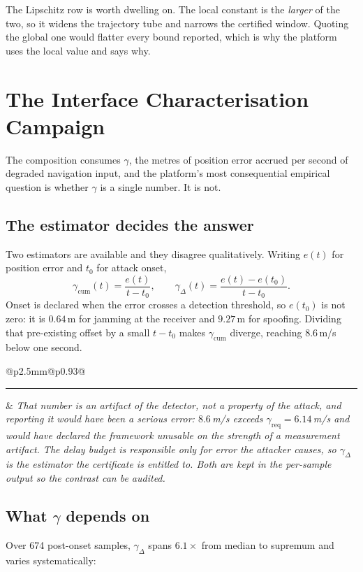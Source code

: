 \documentclass[11pt,a4paper]{article}
\makeatletter
\newcommand{\provbox}[1]{%
  \par\medskip\noindent
  \begin{tabular}{@{}p{2.5mm}@{\hspace{3mm}}p{0.93\linewidth}@{}}
  \textcolor{bridgecol}{\rule{2.5mm}{\baselineskip}} & \small\itshape #1
  \end{tabular}\par\medskip}
\makeatother
\begin{document}
The Lipschitz row is worth dwelling on. The local constant is the \emph{larger}
of the two, so it widens the trajectory tube and narrows the certified window.
Quoting the global one would flatter every bound reported, which is why the
platform uses the local value and says why.

\section{The Interface Characterisation Campaign}

The composition consumes $\gamma$, the metres of position error accrued per
second of degraded navigation input, and the platform's most consequential
empirical question is whether $\gamma$ is a single number. It is not.

\subsection{The estimator decides the answer}
Two estimators are available and they disagree qualitatively. Writing $e(t)$ for
position error and $t_0$ for attack onset,
\[
\gamma_{\mathrm{cum}}(t)=\frac{e(t)}{t-t_0},
\qquad
\gamma_{\Delta}(t)=\frac{e(t)-e(t_0)}{t-t_0}.
\]
Onset is declared when the error crosses a detection threshold, so $e(t_0)$ is
not zero: it is $0.64$\,m for jamming at the receiver and $9.27$\,m for
spoofing. Dividing that pre-existing offset by a small $t-t_0$ makes
$\gamma_{\mathrm{cum}}$ diverge, reaching $8.6$\,m/s below one second.

\provbox{That number is an artifact of the detector, not a property of the
attack, and reporting it would have been a serious error: $8.6$\,m/s exceeds
$\gamma_{\mathrm{req}} = 6.14$\,m/s and would have declared the framework
unusable on the strength of a measurement artifact. The delay budget is
responsible only for error the attacker \emph{causes}, so
$\gamma_{\Delta}$ is the estimator the certificate is entitled to. Both are kept
in the per-sample output so the contrast can be audited.}

\subsection{What $\gamma$ depends on}
Over 674 post-onset samples, $\gamma_{\Delta}$ spans $6.1\times$ from median to
supremum and varies systematically:
\end{document}
